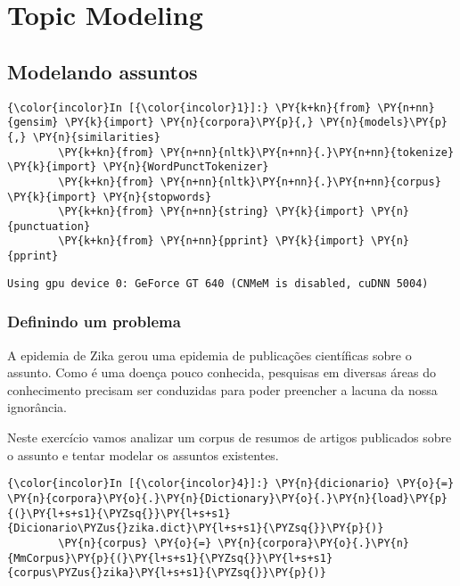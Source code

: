 \chapter{Topic Modeling}

    
    

    
    \section{Modelando assuntos}\label{modelando-assuntos}

    \begin{Verbatim}[commandchars=\\\{\}]
{\color{incolor}In [{\color{incolor}1}]:} \PY{k+kn}{from} \PY{n+nn}{gensim} \PY{k}{import} \PY{n}{corpora}\PY{p}{,} \PY{n}{models}\PY{p}{,} \PY{n}{similarities}
        \PY{k+kn}{from} \PY{n+nn}{nltk}\PY{n+nn}{.}\PY{n+nn}{tokenize} \PY{k}{import} \PY{n}{WordPunctTokenizer}
        \PY{k+kn}{from} \PY{n+nn}{nltk}\PY{n+nn}{.}\PY{n+nn}{corpus} \PY{k}{import} \PY{n}{stopwords}
        \PY{k+kn}{from} \PY{n+nn}{string} \PY{k}{import} \PY{n}{punctuation}
        \PY{k+kn}{from} \PY{n+nn}{pprint} \PY{k}{import} \PY{n}{pprint}
\end{Verbatim}

    \begin{Verbatim}[commandchars=\\\{\}]
Using gpu device 0: GeForce GT 640 (CNMeM is disabled, cuDNN 5004)

    \end{Verbatim}

    \subsection{Definindo um problema}\label{definindo-um-problema}

A epidemia de Zika gerou uma epidemia de publicações científicas sobre o
assunto. Como é uma doença pouco conhecida, pesquisas em diversas áreas
do conhecimento precisam ser conduzidas para poder preencher a lacuna da
nossa ignorância.

Neste exercício vamos analizar um corpus de resumos de artigos
publicados sobre o assunto e tentar modelar os assuntos existentes.

    \begin{Verbatim}[commandchars=\\\{\}]
{\color{incolor}In [{\color{incolor}4}]:} \PY{n}{dicionario} \PY{o}{=} \PY{n}{corpora}\PY{o}{.}\PY{n}{Dictionary}\PY{o}{.}\PY{n}{load}\PY{p}{(}\PY{l+s+s1}{\PYZsq{}}\PY{l+s+s1}{Dicionario\PYZus{}zika.dict}\PY{l+s+s1}{\PYZsq{}}\PY{p}{)}
        \PY{n}{corpus} \PY{o}{=} \PY{n}{corpora}\PY{o}{.}\PY{n}{MmCorpus}\PY{p}{(}\PY{l+s+s1}{\PYZsq{}}\PY{l+s+s1}{corpus\PYZus{}zika}\PY{l+s+s1}{\PYZsq{}}\PY{p}{)}
\end{Verbatim}

